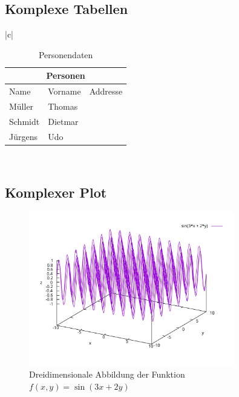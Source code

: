 \documentclass[paper=a4,fontsize=12pt,ngerman]{scrartcl}
\begin{document}
\newcommand{\peopleTable}{
    \begin{tabular}{|l|l|l|}
    \hline
    \multicolumn{3}{|c|}{\textbf{Personen}} \\
    \hline
    Name & Vorname & Addresse \\
    \hline
    Müller & Thomas & \adressTableThomasMueller \\
    \hline
    Schmidt & Dietmar & \adressTableDietmarSchmidt \\
    \hline
    Jürgens & Udo & \adressTableUdoJuergens \\
    \hline
    \end{tabular}
}

\subsection{Komplexe Tabellen}
\begin{table}[H]
\centering
\caption{Studentendatenbank}
\end{table}

\begin{table}[H]
\centering
\caption{Personendaten}
    \begin{tabular}{|c|}
    \hline
    \peopleTable \\
    \hline
    \end{tabular}
\end{table}

\subsection{Komplexer Plot}

\begin{figure}[H]
    \centering
    \includegraphics[width=0.8\textwidth]{graphics/komplexerPlot.pdf}
    \caption{Dreidimensionale Abbildung der Funktion $f(x,y) = \sin(3x+2y)$}
    \label{fig:comlex-plot}
\end{figure}
\end{document}
